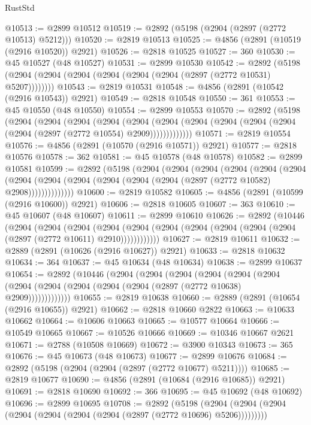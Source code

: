 \begin{lexlean}{RustStd}
\begin{coremodule}
@10513 := @2899 @10512
@10519 := @2892 (@5198 (@2904 (@2897 (@2772 @10513) @5212)))
@10520 := @2819 @10513
@10525 := @4856 (@2891 (@10519 (@2916 @10520)) @2921)
@10526 := @2818 @10525
@10527 := 360
@10530 := @45 @10527 (@48 @10527)
@10531 := @2899 @10530
@10542 := @2892 (@5198 (@2904 (@2904 (@2904 (@2904 (@2904 (@2904 (@2897 (@2772 @10531) @5207))))))))
@10543 := @2819 @10531
@10548 := @4856 (@2891 (@10542 (@2916 @10543)) @2921)
@10549 := @2818 @10548
@10550 := 361
@10553 := @45 @10550 (@48 @10550)
@10554 := @2899 @10553
@10570 := @2892
    (@5198
      (@2904
        (@2904
          (@2904
            (@2904
              (@2904
                (@2904 (@2904 (@2904 (@2904 (@2904 (@2904 (@2897 (@2772 @10554) @2909)))))))))))))
@10571 := @2819 @10554
@10576 := @4856 (@2891 (@10570 (@2916 @10571)) @2921)
@10577 := @2818 @10576
@10578 := 362
@10581 := @45 @10578 (@48 @10578)
@10582 := @2899 @10581
@10599 := @2892
    (@5198
      (@2904
        (@2904
          (@2904
            (@2904
              (@2904
                (@2904
                  (@2904
                    (@2904 (@2904 (@2904 (@2904 (@2904 (@2897 (@2772 @10582) @2908))))))))))))))
@10600 := @2819 @10582
@10605 := @4856 (@2891 (@10599 (@2916 @10600)) @2921)
@10606 := @2818 @10605
@10607 := 363
@10610 := @45 @10607 (@48 @10607)
@10611 := @2899 @10610
@10626 := @2892
    (@10446
      (@2904
        (@2904
          (@2904
            (@2904 (@2904 (@2904 (@2904 (@2904 (@2904 (@2904 (@2897 (@2772 @10611) @2910))))))))))))
@10627 := @2819 @10611
@10632 := @2889 (@2891 (@10626 (@2916 @10627)) @2921)
@10633 := @2818 @10632
@10634 := 364
@10637 := @45 @10634 (@48 @10634)
@10638 := @2899 @10637
@10654 := @2892
    (@10446
      (@2904
        (@2904
          (@2904
            (@2904
              (@2904
                (@2904 (@2904 (@2904 (@2904 (@2904 (@2904 (@2897 (@2772 @10638) @2909)))))))))))))
@10655 := @2819 @10638
@10660 := @2889 (@2891 (@10654 (@2916 @10655)) @2921)
@10662 := @2818 @10660 @2822
@10663 := @10633 @10662
@10664 := @10606 @10663
@10665 := @10577 @10664
@10666 := @10549 @10665
@10667 := @10526 @10666
@10669 := @10346 @10667 @2621
@10671 := @2788 (@10508 @10669)
@10672 := @3900 @10343
@10673 := 365
@10676 := @45 @10673 (@48 @10673)
@10677 := @2899 @10676
@10684 := @2892 (@5198 (@2904 (@2904 (@2897 (@2772 @10677) @5211))))
@10685 := @2819 @10677
@10690 := @4856 (@2891 (@10684 (@2916 @10685)) @2921)
@10691 := @2818 @10690
@10692 := 366
@10695 := @45 @10692 (@48 @10692)
@10696 := @2899 @10695
@10708 := @2892
    (@5198 (@2904 (@2904 (@2904 (@2904 (@2904 (@2904 (@2904 (@2897 (@2772 @10696) @5206)))))))))

\end{coremodule}
\end{lexlean}
